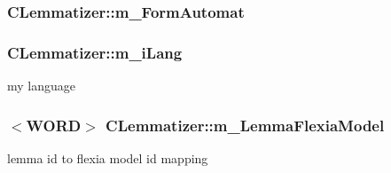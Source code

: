 \hypertarget{classCLemmatizer_a53eefd483fbc7b6f434d0f82818035db}{
\subsubsection[{m\-\_\-\-Form\-Automat}]{ C\-Lemmatizer\-::m\-\_\-\-Form\-Automat\hspace{0.3cm}{\ttfamily [protected]}}}\label{classCLemmatizer_a53eefd483fbc7b6f434d0f82818035db}
\hypertarget{classCLemmatizer_a6d7aba68315463237ddfbec80dc99b7f}{
\subsubsection[{m\-\_\-i\-Lang}]{ C\-Lemmatizer\-::m\-\_\-i\-Lang}}\label{classCLemmatizer_a6d7aba68315463237ddfbec80dc99b7f}


my language 

\hypertarget{classCLemmatizer_aff1ef9346f58dc6ce9dd2d9c2e8e3930}{
\subsubsection[{m\-\_\-\-Lemma\-Flexia\-Model}]{$<${\bf W\-O\-R\-D}$>$ C\-Lemmatizer\-::m\-\_\-\-Lemma\-Flexia\-Model\hspace{0.3cm}{\ttfamily [protected]}}}\label{classCLemmatizer_aff1ef9346f58dc6ce9dd2d9c2e8e3930}


lemma id to flexia model id mapping 

